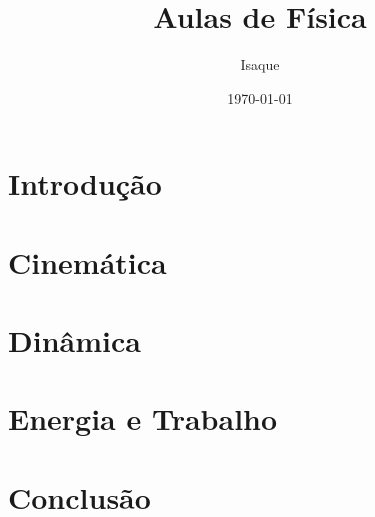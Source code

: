 \documentclass[12pt,a4paper]{book}
\begin{document}
	
	\title{Aulas de Física}
	\author{Isaque}
	\date{\today}
	\maketitle
	
	\tableofcontents
	
	\chapter{Introdução}
	
	
	\chapter{Cinemática}
	
	
	\chapter{Dinâmica}
	
	
	\chapter{Energia e Trabalho}
	
	
	\chapter{Conclusão}
	
	
\end{document}
